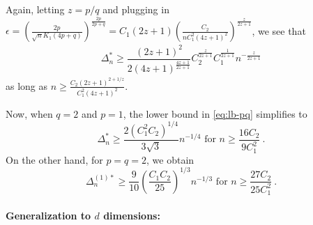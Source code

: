 Again, letting $z=p/q$ and plugging in $\epsilon = \left(\frac{2p}{\sqrt{n} K_1(4p+q)} \right)^{\frac{2p}{2p+q}}=
C_1 (2z+1)\left(\frac{C_2}{n C_1^2(4 z+1)^2}\right)^{\frac{z}{2z+1}}$, we see that \begin{align}
\Delta_n^* \ge \dfrac{\left(2z+1\right)^2}{2\left(4z+1\right)^{\tfrac{4z+1}{2z+1}}}C_2^{\tfrac{z}{2z+1}} C_1^{\frac{1}{2z+1}} n^{-\tfrac{z}{2z+1}}
\label{eq:lb-pq}
\end{align}
as long as $n \ge \frac{C_2 (2z+1)^{2+1/z}}{C_1^2 (4z+1)^2}$.

Now, when $q=2$ and $p=1$, the lower bound in \eqref{eq:lb-pq} simplifies to 
\[
\Delta_n^{*} \ge \dfrac{ 2(C_1^2C_2)^{1/4}}{3\sqrt{3}} n^{-1/4} \text{ for } n \ge \frac{16C_2}{9 C_1^2}~.
\]
On the other hand, for $p=q=2$, we obtain 
\[
\Delta_n^{(1)*} \ge  \frac{9}{10}\left(\frac{C_1 C_2}{25}\right)^{1/3} n^{-1/3} \text{ for } n \ge \frac{27 C_2}{25 C_1^2}~.
\]

\paragraph{Generalization to $d$ dimensions:}

